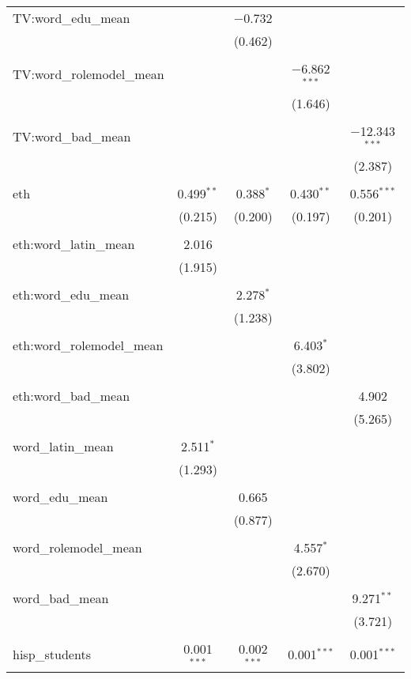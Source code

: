 \begin{table}[!htbp]
\begin{tabular}{@{\extracolsep{-2pt}}lcccc}
 TV:word\_edu\_mean &  & $-$0.732 &  &  \\ 
  &  & (0.462) &  &  \\ 
  & & & & \\ 
 TV:word\_rolemodel\_mean &  &  & $-$6.862$^{***}$ &  \\ 
  &  &  & (1.646) &  \\ 
  & & & & \\ 
 TV:word\_bad\_mean &  &  &  & $-$12.343$^{***}$ \\ 
  &  &  &  & (2.387) \\ 
  & & & & \\ 
 eth & 0.499$^{**}$ & 0.388$^{*}$ & 0.430$^{**}$ & 0.556$^{***}$ \\ 
  & (0.215) & (0.200) & (0.197) & (0.201) \\ 
  & & & & \\ 
 eth:word\_latin\_mean & 2.016 &  &  &  \\ 
  & (1.915) &  &  &  \\ 
  & & & & \\ 
 eth:word\_edu\_mean &  & 2.278$^{*}$ &  &  \\ 
  &  & (1.238) &  &  \\ 
  & & & & \\ 
 eth:word\_rolemodel\_mean &  &  & 6.403$^{*}$ &  \\ 
  &  &  & (3.802) &  \\ 
  & & & & \\ 
 eth:word\_bad\_mean &  &  &  & 4.902 \\ 
  &  &  &  & (5.265) \\ 
  & & & & \\ 
 word\_latin\_mean & 2.511$^{*}$ &  &  &  \\ 
  & (1.293) &  &  &  \\ 
  & & & & \\ 
 word\_edu\_mean &  & 0.665 &  &  \\ 
  &  & (0.877) &  &  \\ 
  & & & & \\ 
 word\_rolemodel\_mean &  &  & 4.557$^{*}$ &  \\ 
  &  &  & (2.670) &  \\ 
  & & & & \\ 
 word\_bad\_mean &  &  &  & 9.271$^{**}$ \\ 
  &  &  &  & (3.721) \\ 
  & & & & \\ 
 hisp\_students & 0.001$^{***}$ & 0.002$^{***}$ & 0.001$^{***}$ & 0.001$^{***}$ \\ 

\end{tabular}
\end{table}
